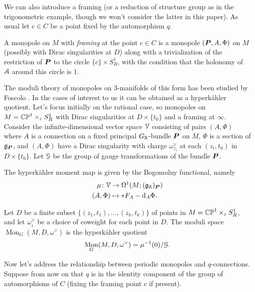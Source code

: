 \documentclass[10pt, oneside]{article}
\DeclareMathOperator{\mon}{Mon}
\renewcommand{\d}{\mathrm{d}}
\begin{document}
We can also introduce a framing (or a reduction of structure group as in the trigonometric example, though we won't consider the latter in this paper).  As usual let $c \in C$ be a point fixed by the automorphism $q$.
\begin{definition}
A monopole on $M$ with \emph{framing} at the point $c \in C$ is a monopole $(\boldsymbol{P},A,\Phi)$ on $M$ (possibly with Dirac singularities at $D$) along with a trivialization of the restriction of $\boldsymbol{P}$ to the circle $\{c\} \times S^1_R$, with the condition that the holonomy of $\mathcal{A}$ around this circle is 1. 
\end{definition}

The moduli theory of monopoles on 3-manifolds of this form has been studied by Foscolo \cite{FoscoloDef}.  In the cases of interest to us it can be obtained as a hyperk\"ahler quotient.  Let's focus initially on the rational case, so monopoles on $M = \mathbb{CP}^1 \times_\varepsilon S^1_R$ with Dirac singularities at $D \times \{t_0\}$ and a framing at $\infty$.  Consider the infinite-dimensional vector space $\mathcal{V}$ consisting of pairs $(A,\Phi)$ where $A$ is a connection on a fixed principal $G_{\mathbb{R}}$-bundle $\boldsymbol{P}$ on $M$, $\Phi$ is a section of $\mathfrak{g}_{\boldsymbol{P}}$, and $(A,\Phi)$ have a Dirac singularity with charge $\omega^\vee_{z_i}$ at each $(z_i,t_0)$ in $D \times \{t_0\}$.  Let $\mathcal{G}$ be the group of gauge transformations of the bundle $\boldsymbol{P}$.

The hyperk\"ahler moment map is given by the Bogomolny functional, namely
\begin{align*}
\mu \colon \mc V &\to \Omega^1(M; (\gg_\RR)_{\bo P}) \\
(A,\Phi) &\mapsto \ast F_A - \d_A \Phi.
\end{align*}

\begin{definition}
Let $D$ be a finite subset $\{(z_1,t_1), \ldots, (z_k, t_k)\}$ of points in $M = \mathbb{CP}^1 \times_\varepsilon S^1_R$, and let $\omega^\vee_{i}$ be a choice of coweight for each point in $D$. The moduli space $\mon_G(M, D, \omega^\vee)$ is the hyperk\"ahler quotient
\[\mon_G(M, D, \omega^\vee) = \mu^{-1}(0) / \mc G.\]
\end{definition}

Now let's address the relationship between periodic monopoles and $q$-connections.  Suppose from now on that $q$ is in the identity component of the group of automorphisms of $C$ (fixing the framing point $c$ if present).
\end{document}
